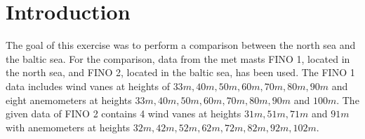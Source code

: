 \documentclass[10pt]{article}
\begin{document}




\onehalfspacing

\tableofcontents
\newpage
\section*{Introduction}
The goal of this exercise was to perform a comparison between
the north sea and the baltic sea.
For the comparison, data from the met masts FINO 1, located in the north sea, and FINO 2, located in the baltic sea, has been used. 
The FINO 1 data includes wind vanes at heights of $33m, 40m, 50m, 60m, 70m, 80m, 90m$ and eight anemometers at heights $33m, 40m, 50m, 60m, 70m, 80m, 90m$ and $100m$.
The given data of FINO 2 contains 4 wind vanes at heights $31m, 51m, 71m$ and $91m$ with anemometers at heights $32m, 42m, 52m, 62m, 72m, 82m, 92m, 102m$.
\end{document}
